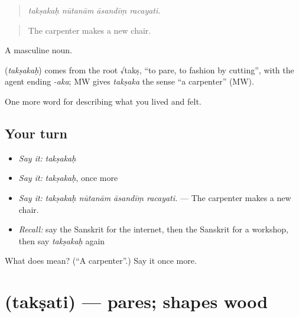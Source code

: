 \begin{quote}
   
\end{quote}

\begin{quote}
\emph{takṣakaḥ nūtanām āsandīṃ racayati.}
\end{quote}

\begin{quote}
The carpenter makes a new chair.
\end{quote}

A masculine noun.

\begin{cousinweb}
\textbf{} (\emph{takṣakaḥ}) comes from the root √takṣ, \textquotedblleft{}to pare, to fashion by cutting\textquotedblright{}, with the agent ending \emph{-aka}; MW gives \emph{takṣaka} the sense \textquotedblleft{}a carpenter\textquotedblright{} (MW).
\end{cousinweb}

\begin{grammarlens}[title={What you've built}]
One more word for describing what you lived and felt.
\end{grammarlens}

\subsection*{Your turn}
\begin{itemize}
\raggedright
  \item \emph{Say it:} \emph{takṣakaḥ}
  \item \emph{Say it:} \emph{takṣakaḥ}, once more
  \item \emph{Say it:} \emph{takṣakaḥ nūtanām āsandīṃ racayati.} — The carpenter makes a new chair.
  \item \emph{Recall:} say the Sanskrit for the internet, then the Sanskrit for a workshop, then say \emph{takṣakaḥ} again
\end{itemize}

\begin{tcolorbox}[breakable,colback=teal!4,colframe=teal!35!black,title={Before you move on}]
What does  mean? (\textquotedblleft{}A carpenter\textquotedblright{}.) Say it once more.
\end{tcolorbox}
\section[\texorpdfstring{\sk{तक्षति} (takṣati)}{तक्षति (takṣati)}]{ (takṣati) — pares; shapes wood}

